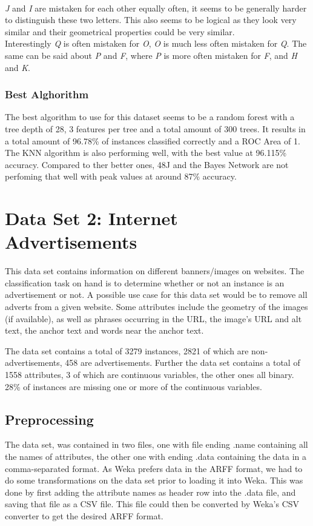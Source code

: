 \documentclass{sig-alternate-05-2015}
\begin{document}
{\paragraph{}\emph{J} and \emph{I} are mistaken for each other equally often, it seems to be generally harder to distinguish these two letters. This also seems to be logical as they look very similar and their geometrical properties could be very similar.\\
Interestingly \emph{Q} is often mistaken for \emph{O}, \emph{O} is much less often mistaken for \emph{Q}. The same can be said about \emph{P} and \emph{F}, where \emph{P} is more often mistaken for \emph{F}, and \emph{H} and \emph{K}.

\subsubsection{Best Alghorithm}
The best algorithm to use for this dataset seems to be a random forest with a tree depth of 28, 3 features per tree and a total amount of 300 trees. It results in a total amount of 96.78\% of instances classified correctly and a ROC Area of 1. The KNN algorithm is also performing well, with the best value at 96.115\% accuracy. Compared to ther better ones, 48J and the Bayes Network are not perfoming that well with peak values at around 87\% accuracy. 


\section{Data Set 2: Internet Advertisements}
This data set contains information on different banners/images on websites. The classification task on hand is to determine whether or not an instance is an advertisement or not. A possible use case for this data set would be to remove all adverts from a given website. Some attributes include the geometry of the images (if available), as well as phrases occurring in the URL, the image's URL and alt text, the anchor text and words near the anchor text.

The data set contains a total of 3279 instances, 2821 of which are non-advertisements, 458 are advertisements. Further the data set contains a total of 1558 attributes, 3 of which are continuous variables, the other ones all binary. 28\% of instances are missing one or more of the continuous variables.


\subsection{Preprocessing}
The data set, was contained in two files, one with file ending .name containing all the names of attributes, the other one with ending .data containing the data in a comma-separated format. As Weka prefers data in the ARFF format, we had to do some transformations on the data set prior to loading it into Weka. This was done by first adding the attribute names as header row into the .data file, and saving that file as a CSV file. This file could then be converted by Weka's CSV converter to get the desired ARFF format.

}
\end{document}

